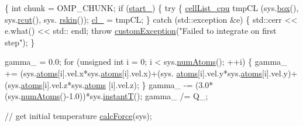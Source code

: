 \begin{DoxyCode}
                                        \{
    \textcolor{keywordtype}{int} chunk = OMP\_CHUNK;
    \textcolor{keywordflow}{if} (\hyperlink{classintegrator_a5b3546a765d8a83b6db8a6d890ace480}{start\_}) \{
        \textcolor{keywordflow}{try} \{
            \hyperlink{classcell_list__cpu}{cellList\_cpu} tmpCL (sys.\hyperlink{classsystem_definition_a85b80dee3609ddb68e370cee3fa959ea}{box}(), sys.\hyperlink{classsystem_definition_acacd88aac7d451bdcf9779ae8c5a95c7}{rcut}(), sys.
      \hyperlink{classsystem_definition_a343c8b17c052215a32412ec3df4f1d9a}{rskin}());
            \hyperlink{classintegrator_ad1f7813c9cf3c31898aa7d78fc22232a}{cl\_} = tmpCL;
        \} \textcolor{keywordflow}{catch} (std::exception &e) \{
            std::cerr << e.what() << std:: endl;
            \textcolor{keywordflow}{throw} \hyperlink{classcustom_exception}{customException}(\textcolor{stringliteral}{"Failed to integrate on first
       step"});
        \}

        gamma\_ = 0.0;
        \textcolor{keywordflow}{for} (\textcolor{keywordtype}{unsigned} \textcolor{keywordtype}{int} i = 0; i < sys.\hyperlink{classsystem_definition_ae8d3c2df2d56241cee03fcc4e2026ae0}{numAtoms}(); ++i)  \{
            gamma\_ += (sys.\hyperlink{classsystem_definition_ae8814d3f60fc1111af2a3f218a4bfcab}{atoms}[i].vel.x*sys.\hyperlink{classsystem_definition_ae8814d3f60fc1111af2a3f218a4bfcab}{atoms}[i].vel.x)+(sys.
      \hyperlink{classsystem_definition_ae8814d3f60fc1111af2a3f218a4bfcab}{atoms}[i].vel.y*sys.\hyperlink{classsystem_definition_ae8814d3f60fc1111af2a3f218a4bfcab}{atoms}[i].vel.y)+(sys.\hyperlink{classsystem_definition_ae8814d3f60fc1111af2a3f218a4bfcab}{atoms}[i].vel.z*sys.\hyperlink{classsystem_definition_ae8814d3f60fc1111af2a3f218a4bfcab}{atoms}
      [i].vel.z);
        \}
        gamma\_ -= (3.0*(sys.\hyperlink{classsystem_definition_ae8d3c2df2d56241cee03fcc4e2026ae0}{numAtoms}()-1.0))*sys.\hyperlink{classsystem_definition_af7b322cfc8abe7042fdbeb0af8e7aa7e}{instantT}();
        gamma\_ /= Q\_;

        \textcolor{comment}{// get initial temperature}
    \hyperlink{classintegrator_ad630bf7c9b7339fa34f36fe43b0d9e3c}{calcForce}(sys);


\end{DoxyCode}
